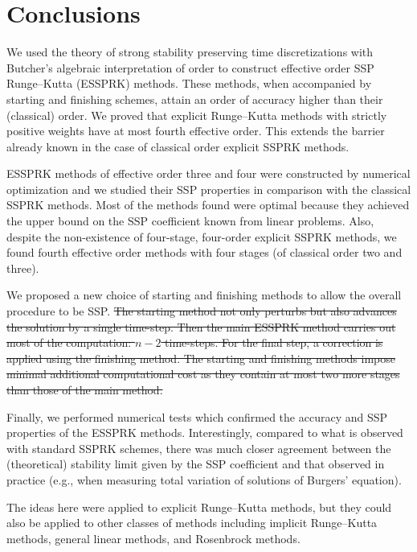 \section{Conclusions}\label{sec:Conclusion}
We used the theory of strong stability preserving time discretizations
with Butcher's algebraic interpretation of order to construct
effective order SSP Runge--Kutta (ESSPRK) methods. 
These methods, when accompanied by starting and finishing 
schemes, attain an order of accuracy higher than their (classical) order.
We proved that explicit Runge--Kutta methods with strictly positive 
weights have at most fourth effective order. 
This extends the barrier already known in the case of classical order
explicit SSPRK methods.

ESSPRK methods of effective order three and four
were constructed by numerical optimization
and we studied their SSP 
properties in comparison with the classical SSPRK methods.
Most of the methods found were optimal because they achieved
the upper bound on the SSP coefficient known from linear
problems.
Also, despite the non-existence of four-stage, four-order explicit SSPRK methods, 
we found fourth effective order methods with four stages (of classical 
order two and three). 

We proposed a new choice of starting and finishing methods to allow the 
overall procedure to be SSP.
\sout{
The starting method not only perturbs but also advances the solution
by a single time-step.
Then the main ESSPRK method carries out most
of the computation: $n-2$ time-steps.
For the final step, a correction is applied using the finishing method.
The starting and finishing methods impose minimal additional computational cost as
they contain at most two more stages than those of the main method.
}

Finally, we performed numerical tests which confirmed the accuracy and
SSP properties of the ESSPRK methods.
Interestingly, compared to what is observed with standard SSPRK schemes,
there was much closer agreement between the (theoretical) stability limit
given by the SSP coefficient and that observed in practice
(e.g., when measuring total variation of solutions of Burgers' equation).

The ideas here were applied to explicit Runge--Kutta methods, but they
could also be applied to other classes of methods including implicit
Runge--Kutta methods, general linear methods, and Rosenbrock methods.
